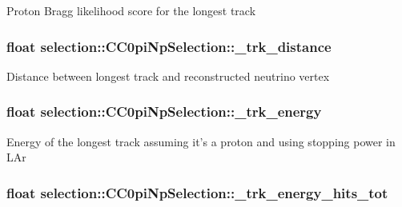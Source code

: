 Proton Bragg likelihood score for the longest track \hypertarget{classselection_1_1CC0piNpSelection_a0f16777192fbed04bcc67edfdfa67e6b}{
\subsubsection[{\-\_\-trk\-\_\-distance}]{\setlength{\rightskip}{0pt plus 5cm}float selection\-::\-C\-C0pi\-Np\-Selection\-::\-\_\-trk\-\_\-distance\hspace{0.3cm}{\ttfamily [private]}}}\label{classselection_1_1CC0piNpSelection_a0f16777192fbed04bcc67edfdfa67e6b}
Distance between longest track and reconstructed neutrino vertex \hypertarget{classselection_1_1CC0piNpSelection_a98e03f33f34b5df397a1d1144b1de4a1}{
\subsubsection[{\-\_\-trk\-\_\-energy}]{\setlength{\rightskip}{0pt plus 5cm}float selection\-::\-C\-C0pi\-Np\-Selection\-::\-\_\-trk\-\_\-energy\hspace{0.3cm}{\ttfamily [private]}}}\label{classselection_1_1CC0piNpSelection_a98e03f33f34b5df397a1d1144b1de4a1}
Energy of the longest track assuming it's a proton and using stopping power in L\-Ar \hypertarget{classselection_1_1CC0piNpSelection_a82a48c6128c34252642d237b98f1b66a}{
\subsubsection[{\-\_\-trk\-\_\-energy\-\_\-hits\-\_\-tot}]{\setlength{\rightskip}{0pt plus 5cm}float selection\-::\-C\-C0pi\-Np\-Selection\-::\-\_\-trk\-\_\-energy\-\_\-hits\-\_\-tot\hspace{0.3cm}{\ttfamily [private]}}}\label{classselection_1_1CC0piNpSelection_a82a48c6128c34252642d237b98f1b66a}
